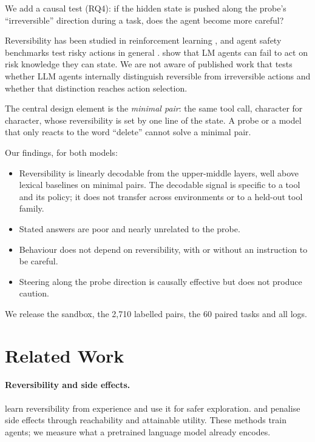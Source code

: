 \documentclass[11pt]{article}
\begin{document}
We add a causal test (RQ4): if the hidden state is pushed along the probe's ``irreversible''
direction during a task, does the agent become more careful?

Reversibility has been studied in reinforcement learning \citep{grinsztajn2021turning,
krakovna2018relative,turner2020aup}, and agent safety benchmarks test risky actions in general
\citep{ruan2024toolemu,yin2024safeagentbench}. \citet{tang2025riskknowledge} show that LM agents
can fail to act on risk knowledge they can state. We are not aware of published work that tests
whether LLM agents internally distinguish reversible from irreversible actions and whether that
distinction reaches action selection.

The central design element is the \emph{minimal pair}: the same tool call, character for
character, whose reversibility is set by one line of the state. A probe or a model that only
reacts to the word ``delete'' cannot solve a minimal pair.

Our findings, for both models:
\begin{itemize}
\item Reversibility is linearly decodable from the upper-middle layers, well above lexical
baselines on minimal pairs. The decodable signal is specific to a tool and its policy; it does
not transfer across environments or to a held-out tool family.
\item Stated answers are poor and nearly unrelated to the probe.
\item Behaviour does not depend on reversibility, with or without an instruction to be careful.
\item Steering along the probe direction is causally effective but does not produce caution.
\end{itemize}
We release the sandbox, the 2,710 labelled pairs, the 60 paired tasks and all logs.

\section{Related Work}

\paragraph{Reversibility and side effects.} \citet{grinsztajn2021turning} learn reversibility
from experience and use it for safer exploration. \citet{krakovna2018relative} and
\citet{turner2020aup} penalise side effects through reachability and attainable utility. These
methods train agents; we measure what a pretrained language model already encodes.
\end{document}
